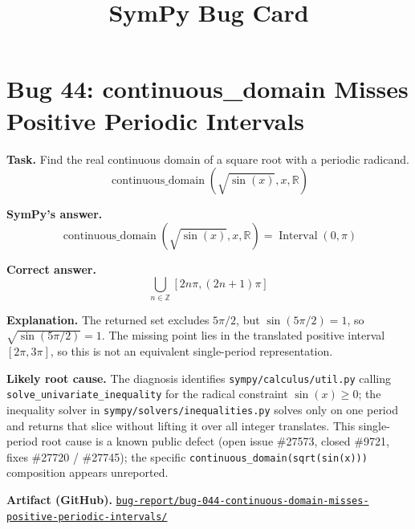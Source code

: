 \documentclass[11pt]{article}
\title{SymPy Bug Card}
\author{}
\date{}
\newcommand{\artifactrepo}{https://github.com/TODO-org/TODO-repo}
\newcommand{\bugbundle}[1]{\href{\artifactrepo/tree/main/bug-report/#1}{\nolinkurl{bug-report/#1/}}}
\begin{document}
\maketitle

\section*{Bug 44: continuous\_domain Misses Positive Periodic Intervals}

\begin{counterexamplebox}
\textbf{Task.} Find the real continuous domain of a square root with a
periodic radicand.
\[
  \operatorname{continuous\_domain}(\sqrt{\sin(x)},x,\mathbb{R})
\]

\medskip
\textbf{SymPy's answer.}
\[
  \operatorname{continuous\_domain}(\sqrt{\sin(x)},x,\mathbb{R})
  = \operatorname{Interval}(0,\pi)
\]

\medskip
\textbf{Correct answer.}
\[
  \bigcup_{n\in\mathbb{Z}} [2n\pi,(2n+1)\pi]
\]

\medskip
\textbf{Explanation.} The returned set excludes \(5\pi/2\), but
\(\sin(5\pi/2)=1\), so \(\sqrt{\sin(5\pi/2)}=1\). The missing point lies in
the translated positive interval \([2\pi,3\pi]\), so this is not an equivalent
single-period representation.

\medskip
\textbf{Likely root cause.} The diagnosis identifies
\nolinkurl{sympy/calculus/util.py} calling
\texttt{solve\_univariate\_inequality} for the radical constraint
\(\sin(x)\geq 0\); the inequality solver in
\nolinkurl{sympy/solvers/inequalities.py} solves only on one period and returns
that slice without lifting it over all integer translates. This single-period
root cause is a known public defect (open issue \#27573, closed \#9721, fixes
\#27720 / \#27745); the specific \nolinkurl{continuous_domain(sqrt(sin(x)))}
composition appears unreported.

\medskip
\textbf{Artifact (GitHub).} \bugbundle{bug-044-continuous-domain-misses-positive-periodic-intervals}
\end{counterexamplebox}
\end{document}
